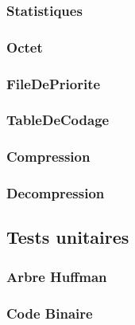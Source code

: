 \documentclass{article}
\begin{document}
\subsubsection{\textbf{Statistiques}}


\subsubsection{\textbf{Octet}}


\subsubsection{\textbf{FileDePriorite}}


\subsubsection{\textbf{TableDeCodage}}


\subsubsection{\textbf{Compression}}


\subsubsection{\textbf{Decompression}}


\subsection{Tests unitaires}

\subsubsection{\textbf{Arbre Huffman}}


\subsubsection{\textbf{Code Binaire}}

\end{document}
